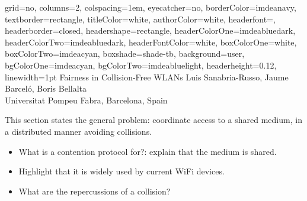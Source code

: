 \documentclass[portrait,a0paper]{baposter}
\begin{document}
\background
{
%
}

\begin{poster}
{
	grid=no,
	columns=2,
	colspacing=1em,
	eyecatcher=no,
	borderColor=imdeanavy,
	textborder=rectangle,
  	titleColor=white,
    	authorColor=white,
	headerfont=\textsf,
	headerborder=closed,
	headershape=rectangle,
	headerColorOne=imdeabluedark,
	headerColorTwo=imdeabluedark,
	headerFontColor=white,
	boxColorOne=white,
	boxColorTwo=imdeacyan,
	boxshade=shade-tb,
	background=user,
	bgColorOne=imdeacyan,
	bgColorTwo=imdeabluelight,
	headerheight=0.12\textheight,
	linewidth=1pt
}
{
}
{Fairness in Collision-Free WLANs}
{
	Luis Sanabria-Russo, Jaume Barcel{\'o}, Boris Bellalta\vspace{0.5em}\\
	\normalsize Universitat Pompeu Fabra, Barcelona, Spain
}

{

This section states the general problem: coordinate access to a shared medium, in a distributed manner avoiding collisions.
\begin{itemize}
 \item What is a contention protocol for?: explain that the medium is shared.
 \item Highlight that it is widely used by current WiFi devices.
 \item What are the repercussions of a collision?
\end{itemize}

}


\end{poster}
\end{document}

